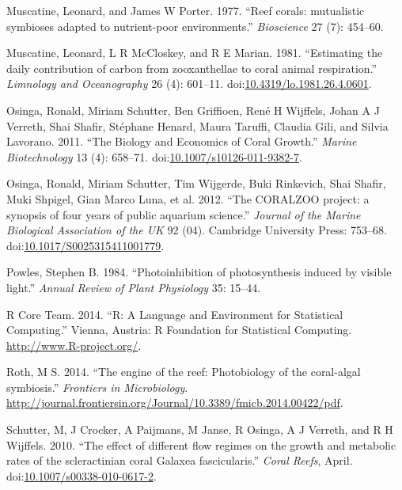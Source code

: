 \documentclass[]{elsarticle} %
\begin{document}
\hypertarget{ref-Muscatine:1977p4220}{}
Muscatine, Leonard, and James W Porter. 1977. ``Reef corals: mutualistic
symbioses adapted to nutrient-poor environments.'' \emph{Bioscience} 27
(7): 454--60.

\hypertarget{ref-Muscatine:1981jy}{}
Muscatine, Leonard, L R McCloskey, and R E Marian. 1981. ``Estimating
the daily contribution of carbon from zooxanthellae to coral animal
respiration.'' \emph{Limnology and Oceanography} 26 (4): 601--11.
doi:\href{https://doi.org/10.4319/lo.1981.26.4.0601}{10.4319/lo.1981.26.4.0601}.

\hypertarget{ref-Osinga:2011kq}{}
Osinga, Ronald, Miriam Schutter, Ben Griffioen, René H Wijffels, Johan A
J Verreth, Shai Shafir, Stéphane Henard, Maura Taruffi, Claudia Gili,
and Silvia Lavorano. 2011. ``The Biology and Economics of Coral
Growth.'' \emph{Marine Biotechnology} 13 (4): 658--71.
doi:\href{https://doi.org/10.1007/s10126-011-9382-7}{10.1007/s10126-011-9382-7}.

\hypertarget{ref-Osinga:2012is}{}
Osinga, Ronald, Miriam Schutter, Tim Wijgerde, Buki Rinkevich, Shai
Shafir, Muki Shpigel, Gian Marco Luna, et al. 2012. ``The CORALZOO
project: a synopsis of four years of public aquarium science.''
\emph{Journal of the Marine Biological Association of the UK} 92 (04).
Cambridge University Press: 753--68.
doi:\href{https://doi.org/10.1017/S0025315411001779}{10.1017/S0025315411001779}.

\hypertarget{ref-Powles:1984tm}{}
Powles, Stephen B. 1984. ``Photoinhibition of photosynthesis induced by
visible light.'' \emph{Annual Review of Plant Physiology} 35: 15--44.

\hypertarget{ref-RALanguageandEn:2014wf}{}
R Core Team. 2014. ``R: A Language and Environment for Statistical
Computing.'' Vienna, Austria: R Foundation for Statistical Computing.
\url{http://www.R-project.org/}.

\hypertarget{ref-Roth:2014wf}{}
Roth, M S. 2014. ``The engine of the reef: Photobiology of the
coral-algal symbiosis.'' \emph{Frontiers in Microbiology}.
\url{http://journal.frontiersin.org/Journal/10.3389/fmicb.2014.00422/pdf}.

\hypertarget{ref-Schutter:2010p7758}{}
Schutter, M, J Crocker, A Paijmans, M Janse, R Osinga, A J Verreth, and
R H Wijffels. 2010. ``The effect of different flow regimes on the growth
and metabolic rates of the scleractinian coral Galaxea fascicularis.''
\emph{Coral Reefs}, April.
doi:\href{https://doi.org/10.1007/s00338-010-0617-2}{10.1007/s00338-010-0617-2}.
\end{document}
